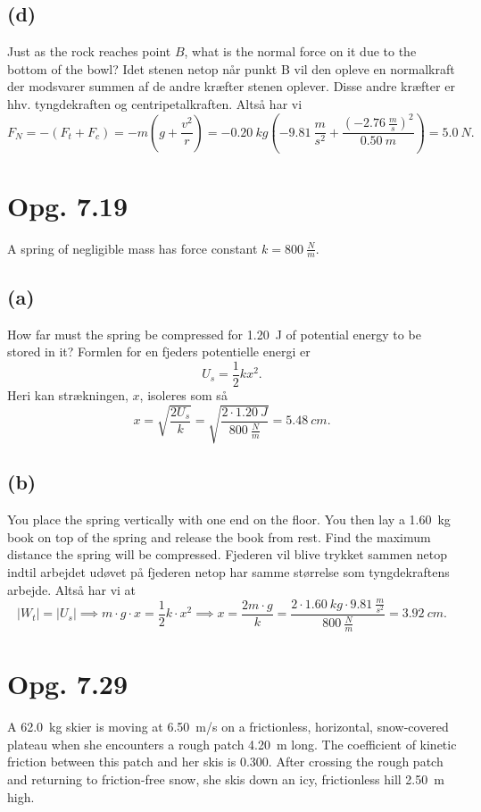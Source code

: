 \documentclass[12pt]{article}
\begin{document}
\subsection*{(d)}
Just as the rock reaches point $B$, what is the normal force on it due to the bottom of the bowl?
\bigbreak
Idet stenen netop når punkt B vil den opleve en normalkraft der modsvarer summen af de andre kræfter stenen oplever. Disse andre kræfter er hhv. tyngdekraften og centripetalkraften. Altså har vi
\[
F_N = -(F_t + F_c) = -m(g + \frac{v^2}{r}) = - \qty{0,20}{kg}\left( \qty{-9,81}{\frac{m}{s^2}} + \frac{(\qty{-2,76}{\frac{m}{s}})^2}{\qty{0,50}{m}} \right) = \qty{5,0}{N} 
.\] 

\section*{Opg. 7.19}
A spring of negligible mass has force constant $k = \qty{800}{\frac{N}{m}}$.

\subsection*{(a)}
How far must the spring be compressed for \qty{1,20}{J} of potential energy to be stored in it?
\bigbreak
Formlen for en fjeders potentielle energi er
\[
U_s = \frac{1}{2}kx^2
.\] 
Heri kan strækningen, $x$, isoleres som så
\[
x = \sqrt{\frac{2U_s}{k}} = \sqrt{\frac{2\cdot \qty{1,20}{J}}{\qty{800}{\frac{N}{m}}}} = \qty{5,48}{cm}
.\] 

\subsection*{(b)}
You place the spring vertically with one end on the floor. You then lay a \qty{1,60}{kg} book on top of the spring and release the book from rest. Find the maximum distance the spring will be compressed.
\bigbreak
Fjederen vil blive trykket sammen netop indtil arbejdet udøvet på fjederen netop har samme størrelse som tyngdekraftens arbejde. Altså har vi at
\[
|W_t| = |U_s| \implies m\cdot g\cdot x = \frac{1}{2} k\cdot x^2 \implies x = \frac{2m\cdot g}{k} = \frac{2\cdot \qty{1,60}{kg}\cdot \qty{9,81}{\frac{m}{s^2}}}{\qty{800}{\frac{N}{m}}} = \qty{3,92}{cm}
.\] 


\section*{Opg. 7.29}
A \qty{62,0}{kg} skier is moving at \qty{6,50}{m/s} on a frictionless, horizontal, snow-covered plateau when she encounters a rough patch \qty{4,20}{m} long. The coefficient of kinetic friction between this patch and her skis is \num{0,300}. After crossing the rough patch and returning to friction-free snow, she skis down an icy, frictionless hill \qty{2,50}{m} high.
\end{document}
